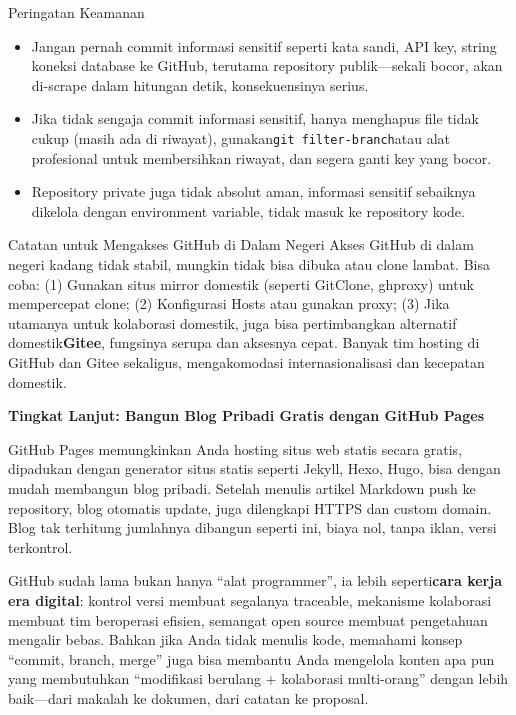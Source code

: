 \begin{tcbwarn}{Peringatan Keamanan}
\begin{itemize}
  \item Jangan pernah commit informasi sensitif seperti kata sandi, API key, string koneksi database ke GitHub, terutama repository publik—sekali bocor, akan di-scrape dalam hitungan detik, konsekuensinya serius.
  \item Jika tidak sengaja commit informasi sensitif, hanya menghapus file tidak cukup (masih ada di riwayat), gunakan\texttt{git filter-\allowbreak branch}atau alat profesional untuk membersihkan riwayat, dan segera ganti key yang bocor.
  \item Repository private juga tidak absolut aman, informasi sensitif sebaiknya dikelola dengan environment variable, tidak masuk ke repository kode.
\end{itemize}

\end{tcbwarn}

\begin{tcbinfo}{Catatan untuk Mengakses GitHub di Dalam Negeri}
Akses GitHub di dalam negeri kadang tidak stabil, mungkin tidak bisa dibuka atau clone lambat. Bisa coba: (1) Gunakan situs mirror domestik (seperti GitClone, ghproxy) untuk mempercepat clone; (2) Konfigurasi Hosts atau gunakan proxy; (3) Jika utamanya untuk kolaborasi domestik, juga bisa pertimbangkan alternatif domestik\textbf{Gitee}, fungsinya serupa dan aksesnya cepat. Banyak tim hosting di GitHub dan Gitee sekaligus, mengakomodasi internasionalisasi dan kecepatan domestik.

\end{tcbinfo}

\textbf{Tingkat Lanjut: Bangun Blog Pribadi Gratis dengan GitHub Pages}\par

GitHub Pages memungkinkan Anda hosting situs web statis secara gratis, dipadukan dengan generator situs statis seperti Jekyll, Hexo, Hugo, bisa dengan mudah membangun blog pribadi. Setelah menulis artikel Markdown push ke repository, blog otomatis update, juga dilengkapi HTTPS dan custom domain. Blog tak terhitung jumlahnya dibangun seperti ini, biaya nol, tanpa iklan, versi terkontrol.


GitHub sudah lama bukan hanya “alat programmer”, ia lebih seperti\textbf{cara kerja era digital}: kontrol versi membuat segalanya traceable, mekanisme kolaborasi membuat tim beroperasi efisien, semangat open source membuat pengetahuan mengalir bebas. Bahkan jika Anda tidak menulis kode, memahami konsep “commit, branch, merge” juga bisa membantu Anda mengelola konten apa pun yang membutuhkan “modifikasi berulang + kolaborasi multi-orang” dengan lebih baik—dari makalah ke dokumen, dari catatan ke proposal.

